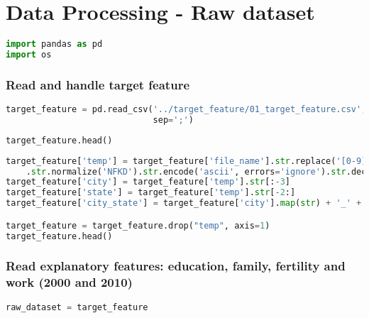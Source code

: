 \section{Data Processing - Raw dataset}\label{ape:data_processing_raw_dataset}

\begin{lstlisting}[language=Python]
import pandas as pd
import os
\end{lstlisting}

\subsubsection{Read and handle target
feature}\label{read-and-handle-target-feature}

\begin{lstlisting}[language=Python]
target_feature = pd.read_csv('../target_feature/01_target_feature.csv',
                             sep=';')
\end{lstlisting}

\begin{lstlisting}[language=Python]
target_feature.head()
\end{lstlisting}

\begin{lstlisting}[language=Python]
target_feature['temp'] = target_feature['file_name'].str.replace('[0-9]|.pdf|-', ' ', regex=True)\
    .str.normalize('NFKD').str.encode('ascii', errors='ignore').str.decode('utf-8').str.lower().str.strip()
target_feature['city'] = target_feature['temp'].str[:-3]
target_feature['state'] = target_feature['temp'].str[-2:]
target_feature['city_state'] = target_feature['city'].map(str) + '_' + target_feature['state']

target_feature = target_feature.drop("temp", axis=1)
target_feature.head()
\end{lstlisting}

\subsubsection{Read explanatory features: education, family, fertility
and work (2000 and
2010)}\label{read-explanatory-features-education-family-fertility-and-work-2000-and-2010}

\begin{lstlisting}[language=Python]
raw_dataset = target_feature
\end{lstlisting}

